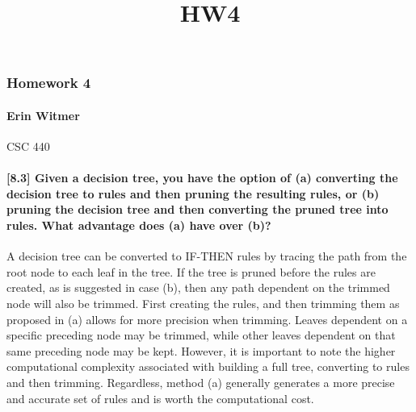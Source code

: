 \documentclass[11pt]{article}
\title{HW4}
\begin{document}
    
    
    \maketitle
    
    

    
    \subsubsection{Homework 4}\label{homework-4}

    \paragraph{Erin Witmer}\label{erin-witmer}

CSC 440

    \paragraph{{[}8.3{]} Given a decision tree, you have the option of (a)
converting the decision tree to rules and then pruning the resulting
rules, or (b) pruning the decision tree and then converting the pruned
tree into rules. What advantage does (a) have over
(b)?}\label{given-a-decision-tree-you-have-the-option-of-a-converting-the-decision-tree-to-rules-and-then-pruning-the-resulting-rules-or-b-pruning-the-decision-tree-and-then-converting-the-pruned-tree-into-rules.-what-advantage-does-a-have-over-b}

    A decision tree can be converted to IF-THEN rules by tracing the path
from the root node to each leaf in the tree. If the tree is pruned
before the rules are created, as is suggested in case (b), then any path
dependent on the trimmed node will also be trimmed. First creating the
rules, and then trimming them as proposed in (a) allows for more
precision when trimming. Leaves dependent on a specific preceding node
may be trimmed, while other leaves dependent on that same preceding node
may be kept. However, it is important to note the higher computational
complexity associated with building a full tree, converting to rules and
then trimming. Regardless, method (a) generally generates a more precise
and accurate set of rules and is worth the computational cost.
\end{document}
